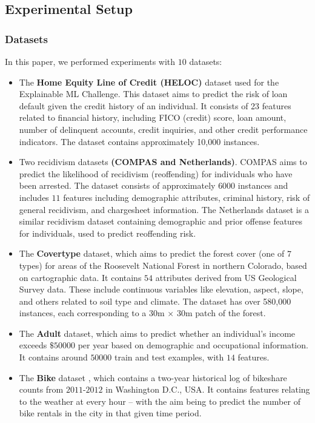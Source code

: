 \subsection{Experimental Setup}
\label{sec:experimental_setup}
\subsubsection{Datasets}
In this paper, we performed experiments with $10$ datasets:
\begin{itemize}
    \item The \textbf{Home Equity Line of Credit (HELOC)} \cite{heloc} dataset used for the Explainable ML Challenge. This dataset aims to predict the risk of loan default given the credit history of an individual. It consists of 23 features related to financial history, including FICO (credit) score, loan amount, number of delinquent accounts, credit inquiries, and other credit performance indicators. The dataset contains approximately 10,000 instances. 
    \item Two recidivism datasets \textbf{(COMPAS and Netherlands)}. COMPAS aims to predict the likelihood of recidivism (reoffending) for individuals who have been arrested. The dataset consists of approximately $6000$ instances and includes $11$ features including demographic attributes, criminal history, risk of general recidivism, and chargesheet information. The Netherlands dataset is a similar recidivism dataset containing demographic and prior offense features for individuals, used to predict reoffending risk.
    \item The \textbf{Covertype} dataset, which aims to predict the forest cover (one of $7$ types) for areas of the Roosevelt National Forest in northern Colorado, based on cartographic data. It contains $54$ attributes derived from US Geological Survey data. These include continuous variables like elevation, aspect, slope, and others related to soil type and climate. The dataset has over 580,000 instances, each corresponding to a $30$m $\times$ $30$m patch of the forest. 
    \item The \textbf{Adult} dataset, which aims  to predict whether an individual's income exceeds $\$50000$ per year based on demographic and occupational information. It contains around $50000$ train and test examples, with $14$ features.
    \item The \textbf{Bike} dataset \cite{fanaee2013event}, which contains a two-year historical log of bikeshare counts from $2011$-$2012$ in Washington D.C., USA. It contains features relating to the weather at every hour -- with the aim being to predict the number of bike rentals in the city in that given time period.

\end{itemize}
